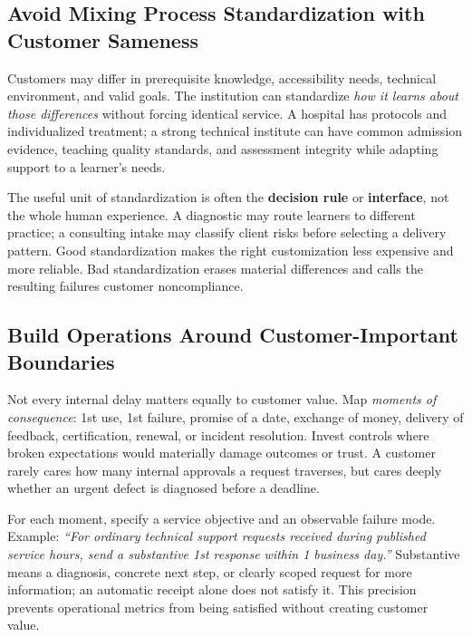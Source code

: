 \subsection{Avoid Mixing Process Standardization with Customer Sameness}
\label{sec:process_vs_customer_sameness}

Customers may differ in prerequisite knowledge, accessibility needs, technical environment, and valid goals. The institution can standardize \textit{how it learns about those differences} without forcing identical service. A hospital has protocols and individualized treatment; a strong technical institute can have common admission evidence, teaching quality standards, and assessment integrity while adapting support to a learner's needs.

The useful unit of standardization is often the \textbf{decision rule} or \textbf{interface}, not the whole human experience. A diagnostic may route learners to different practice; a consulting intake may classify client risks before selecting a delivery pattern. Good standardization makes the right customization less expensive and more reliable. Bad standardization erases material differences and calls the resulting failures customer noncompliance.

\subsection{Build Operations Around Customer-Important Boundaries}
\label{sec:customer_important_boundaries}

Not every internal delay matters equally to customer value. Map \textit{moments of consequence}: 1st use, 1st failure, promise of a date, exchange of money, delivery of feedback, certification, renewal, or incident resolution. Invest controls where broken expectations would materially damage outcomes or trust. A customer rarely cares how many internal approvals a request traverses, but cares deeply whether an urgent defect is diagnosed before a deadline.

For each moment, specify a service objective and an observable failure mode. Example: \textit{``For ordinary technical support requests received during published service hours, send a substantive 1st response within 1 business day.''} Substantive means a diagnosis, concrete next step, or clearly scoped request for more information; an automatic receipt alone does not satisfy it. This precision prevents operational metrics from being satisfied without creating customer value.
